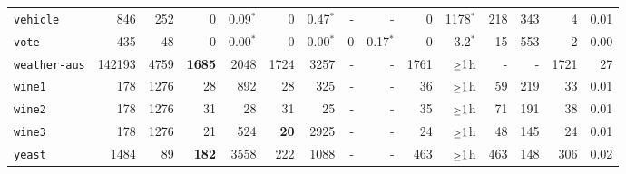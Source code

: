 \begin{tabular}{lccrrrrrrrrrrrr}
\texttt{vehicle} & \multicolumn{1}{r}{846} & \multicolumn{1}{r}{252}  & 0 & 0.09$^*$ & 0 & 0.47$^*$ & - & - & 0 & 1178$^*$ & 218 & 343 & 4 & 0.01\\
\texttt{vote} & \multicolumn{1}{r}{435} & \multicolumn{1}{r}{48}  & 0 & 0.00$^*$ & 0 & 0.00$^*$ & 0 & 0.17$^*$ & 0 & 3.2$^*$ & 15 & 553 & 2 & 0.00\\
\texttt{weather-aus} & \multicolumn{1}{r}{142193} & \multicolumn{1}{r}{4759}  & \textbf{1685} & 2048 & 1724 & 3257 & - & - & 1761 & $\mathsmaller{\geq}1$h & - & - & 1721 & 27\\
\texttt{wine1} & \multicolumn{1}{r}{178} & \multicolumn{1}{r}{1276}  & 28 & 892 & 28 & 325 & - & - & 36 & $\mathsmaller{\geq}1$h & 59 & 219 & 33 & 0.01\\
\texttt{wine2} & \multicolumn{1}{r}{178} & \multicolumn{1}{r}{1276}  & 31 & 28 & 31 & 25 & - & - & 35 & $\mathsmaller{\geq}1$h & 71 & 191 & 38 & 0.01\\
\texttt{wine3} & \multicolumn{1}{r}{178} & \multicolumn{1}{r}{1276}  & 21 & 524 & \textbf{20} & 2925 & - & - & 24 & $\mathsmaller{\geq}1$h & 48 & 145 & 24 & 0.01\\
\texttt{yeast} & \multicolumn{1}{r}{1484} & \multicolumn{1}{r}{89}  & \textbf{182} & 3558 & 222 & 1088 & - & - & 463 & $\mathsmaller{\geq}1$h & 463 & 148 & 306 & 0.02\\
\bottomrule
\end{tabular}
